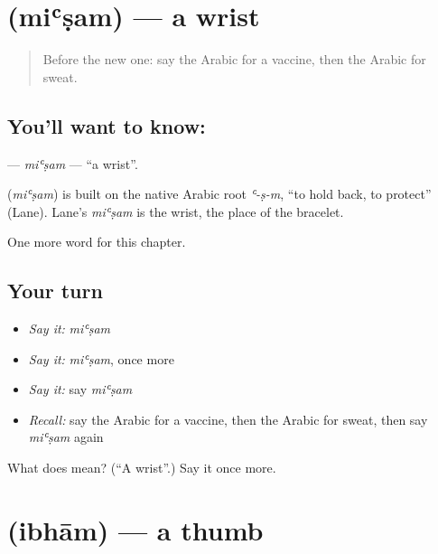 \section[\texorpdfstring{\ar{معصم} (miʿṣam)}{معصم (miʿṣam)}]{ (miʿṣam) — a wrist}

\label{lesson:AR-C263-misam}



\begin{quote}
Before the new one: say the Arabic for a vaccine, then the Arabic for sweat.
\end{quote}

\subsection*{You'll want to know: }
\textbf{} — \emph{miʿṣam} — \textquotedblleft{}a wrist\textquotedblright{}.

\begin{cousinweb}
\textbf{} (\emph{miʿṣam}) is built on the native Arabic root \emph{ʿ-ṣ-m}, \textquotedblleft{}to hold back, to protect\textquotedblright{} (Lane). Lane's \emph{miʿṣam} is the wrist, the place of the bracelet.
\end{cousinweb}

\begin{grammarlens}[title={What you've built}]
One more word for this chapter.
\end{grammarlens}

\subsection*{Your turn}
\begin{itemize}
\raggedright
  \item \emph{Say it:} \emph{miʿṣam}
  \item \emph{Say it:} \emph{miʿṣam}, once more
  \item \emph{Say it:} say \emph{miʿṣam}
  \item \emph{Recall:} say the Arabic for a vaccine, then the Arabic for sweat, then say \emph{miʿṣam} again
\end{itemize}

\begin{tcolorbox}[breakable,colback=teal!4,colframe=teal!35!black,title={Before you move on}]
What does  mean? (\textquotedblleft{}A wrist\textquotedblright{}.) Say it once more.
\end{tcolorbox}
\section[\texorpdfstring{\ar{إبهام} (ibhām)}{إبهام (ibhām)}]{ (ibhām) — a thumb}

